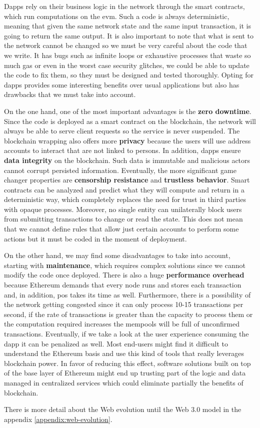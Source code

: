 {Dapps rely on their business logic in the network through the smart contracts, which run computations on the \acrlong{evm}. Such a code is always deterministic, meaning that given the same network state and the same input transaction, it is going to return the same output. It is also important to note that what is sent to the network cannot be changed so we must be very careful about the code that we write. It has bugs such as infinite loops or exhaustive processes that waste so much gas or even in the worst case security glitches, we could be able to update the code to fix them, so they must be designed and tested thoroughly. Opting for dapps provides some interesting benefits over usual applications but also has drawbacks that we must take into account. 

On the one hand, one of the most important advantages is the \textbf{zero downtime}. Since the code is deployed as a smart contract on the blockchain, the network will always be able to serve client requests so the service is never suspended. The blockchain wrapping also offers more \textbf{privacy} because the users will use address accounts to interact that are not linked to persons. In addition, dapps ensure \textbf{data integrity} on the blockchain. Such data is immutable and malicious actors cannot corrupt persisted information. Eventually, the more significant game changer properties are \textbf{censorship resistance} and 
\textbf{trustless behavior}. Smart contracts can be analyzed and predict what they will compute and return in a deterministic way, which completely replaces the need for trust in third parties with opaque processes. Moreover, no single entity can unilaterally block users from submitting transactions to change or read the state. This does not mean that we cannot define rules that allow just certain accounts to perform some actions but it must be coded in the moment of deployment. 

On the other hand, we may find some disadvantages to take into account, starting with \textbf{maintenance}, which requires complex solutions since we cannot modify the code once deployed. There is also a huge \textbf{performance overhead} because Ethereum demands that every node runs and stores each transaction and, in addition, \acrlong{pos} takes its time as well. Furthermore, there is a possibility of the network getting congested since it can only process 10-15 transactions per second, if the rate of transactions is greater than the capacity to process them or the computation required increases the mempools will be full of unconfirmed transactions. Eventually, if we take a look at the user experience consuming the dapp it can be penalized as well. Most end-users might find it difficult to understand the Ethereum basis and use this kind of tools that really leverages blockchain power. In favor of reducing this effect, software solutions built on top of the base layer of Ethereum might end up trusting part of the logic and data managed in centralized services which could eliminate partially the benefits of blockchain.

There is more detail about the Web evolution until the Web 3.0 model in the appendix \ref{appendix:web-evolution}.
}
